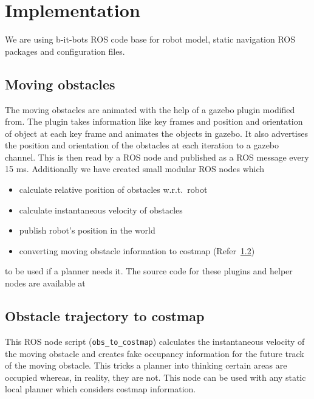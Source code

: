 
\chapter{Implementation}

We are using b-it-bots ROS code base\cite{bitbots} for robot model, static navigation ROS packages
and configuration files.

\section{Moving obstacles}%
\label{sec:moving_obstacles}

The moving obstacles are animated with the help of a gazebo plugin modified from\cite{animatedBox}.
The plugin takes information like key frames and position and orientation of object at each
key frame and animates the objects in gazebo. It also advertises the position and orientation
of the obstacles at each iteration to a gazebo channel. This is then read by a ROS node and 
published as a ROS message every 15 ms.
Additionally we have created small modular ROS nodes which 
\begin{itemize}
    \item calculate relative position of obstacles w.r.t.\ robot
    \item calculate instantaneous velocity of obstacles
    \item publish robot's position in the world
    \item converting moving obstacle information to costmap (Refer~\ref{sec:obstacle_trajectory_to_costmap})
\end{itemize} 
to be used if a planner needs it.
The source code for these plugins and helper nodes are available at~\cite{movingObstacleGazebo}

\section{Obstacle trajectory to costmap}%
\label{sec:obstacle_trajectory_to_costmap}
    This ROS node script (\texttt{obs\_to\_costmap}) calculates the instantaneous velocity of the 
    moving obstacle and creates fake occupancy information for the future track of the moving obstacle. 
    This tricks a planner into thinking certain areas are occupied whereas, in reality, they are not. 
    This node can be used with any static local planner which considers costmap\cite{costmap} information.
    
